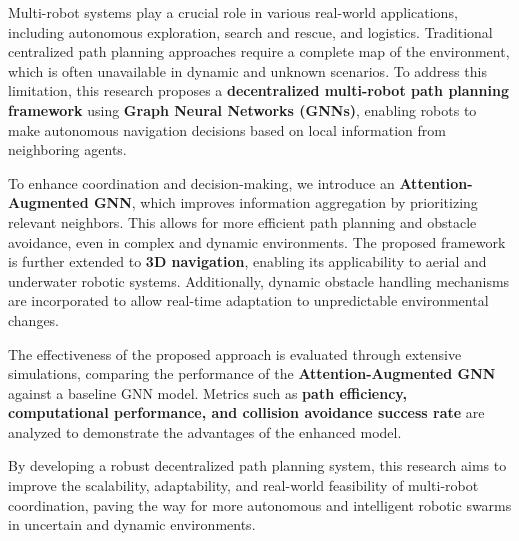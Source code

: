 Multi-robot systems play a crucial role in various real-world applications, including autonomous exploration, search and rescue, and logistics. Traditional centralized path planning approaches require a complete map of the environment, which is often unavailable in dynamic and unknown scenarios. To address this limitation, this research proposes a \textbf{decentralized multi-robot path planning framework} using \textbf{Graph Neural Networks (GNNs)}, enabling robots to make autonomous navigation decisions based on local information from neighboring agents.

To enhance coordination and decision-making, we introduce an \textbf{Attention-Augmented GNN}, which improves information aggregation by prioritizing relevant neighbors. This allows for more efficient path planning and obstacle avoidance, even in complex and dynamic environments. The proposed framework is further extended to \textbf{3D navigation}, enabling its applicability to aerial and underwater robotic systems. Additionally, dynamic obstacle handling mechanisms are incorporated to allow real-time adaptation to unpredictable environmental changes.

The effectiveness of the proposed approach is evaluated through extensive simulations, comparing the performance of the \textbf{Attention-Augmented GNN} against a baseline GNN model. Metrics such as \textbf{path efficiency, computational performance, and collision avoidance success rate} are analyzed to demonstrate the advantages of the enhanced model.

By developing a robust decentralized path planning system, this research aims to improve the scalability, adaptability, and real-world feasibility of multi-robot coordination, paving the way for more autonomous and intelligent robotic swarms in uncertain and dynamic environments.

 